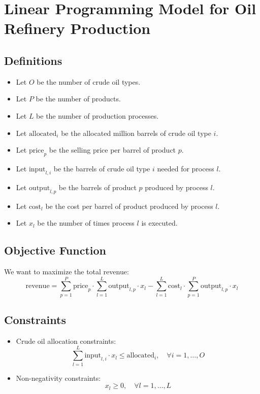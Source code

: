 \documentclass{article}
\begin{document}
\section*{Linear Programming Model for Oil Refinery Production}

\subsection*{Definitions}
\begin{itemize}
    \item Let $O$ be the number of crude oil types.
    \item Let $P$ be the number of products.
    \item Let $L$ be the number of production processes.
    \item Let $\text{allocated}_i$ be the allocated million barrels of crude oil type $i$.
    \item Let $\text{price}_p$ be the selling price per barrel of product $p$.
    \item Let $\text{input}_{l,i}$ be the barrels of crude oil type $i$ needed for process $l$.
    \item Let $\text{output}_{l,p}$ be the barrels of product $p$ produced by process $l$.
    \item Let $\text{cost}_l$ be the cost per barrel of product produced by process $l$.
    \item Let $x_l$ be the number of times process $l$ is executed.
\end{itemize}

\subsection*{Objective Function}
We want to maximize the total revenue:
\[
\text{revenue} = \sum_{p=1}^{P} \text{price}_p \cdot \sum_{l=1}^{L} \text{output}_{l,p} \cdot x_l - \sum_{l=1}^{L} \text{cost}_l \cdot \sum_{p=1}^{P} \text{output}_{l,p} \cdot x_l 
\]

\subsection*{Constraints}
\begin{itemize}
    \item Crude oil allocation constraints:
    \[
    \sum_{l=1}^{L} \text{input}_{l,i} \cdot x_l \leq \text{allocated}_i, \quad \forall i = 1, \ldots, O
    \]
    \item Non-negativity constraints:
    \[
    x_l \geq 0, \quad \forall l = 1, \ldots, L
    \]
\end{itemize}
\end{document}
